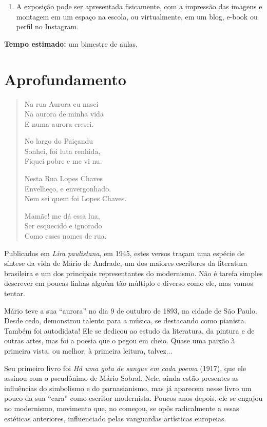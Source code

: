 \documentclass[12pt]{extarticle}
\begin{document}
{\begin{enumerate}
\item A exposição pode ser apresentada fisicamente, com a impressão das
imagens e montagem em um espaço na escola, ou virtualmente, em um blog,
e-book ou perfil no Instagram.
\end{enumerate}

\textbf{Tempo estimado:} um bimestre de aulas.

\section{Aprofundamento}

\begin{verse}
Na rua Aurora eu nasci\\
Na aurora de minha vida\\
E numa aurora cresci. 

No largo do Paiçandu\\
Sonhei, foi luta renhida,\\
Fiquei pobre e me vi nu. 

Nesta Rua Lopes Chaves\\
Envelheço, e envergonhado.\\
Nem sei quem foi Lopes Chaves. 

Mamãe! me dá essa lua,\\
Ser esquecido e ignorado\\
Como esses nomes de rua.
\end{verse}

Publicados em
\emph{Lira paulistana}, em 1945, estes versos traçam uma espécie de
síntese da vida de Mário de Andrade, um dos maiores escritores da
literatura brasileira e um dos principais representantes do modernismo.
Não é tarefa simples descrever em poucas linhas alguém tão múltiplo e
diverso como ele, mas vamos tentar.

Mário teve a sua ``aurora'' no dia 9 de outubro de 1893, na cidade de
São Paulo. Desde cedo, demonstrou talento para a música, se destacando
como pianista. Também foi autodidata! Ele se dedicou ao estudo da
literatura, da pintura e de outras artes, mas foi a poesia que o pegou
em cheio. Quase uma paixão à primeira vista, ou melhor, à primeira
leitura, talvez...

Seu primeiro livro foi \emph{Há uma gota de sangue em cada poema}
(1917), que ele assinou com o pseudônimo de Mário Sobral. Nele, ainda
estão presentes as influências do simbolismo e do parnasianismo, mas já
aparecem nesse livro um pouco da sua ``cara'' como escritor modernista.
Poucos anos depois, ele se engajou no modernismo, movimento que, no
começou, se opôs radicalmente a essas estéticas anteriores, influenciado
pelas vanguardas artísticas europeias.

}
\end{document}
